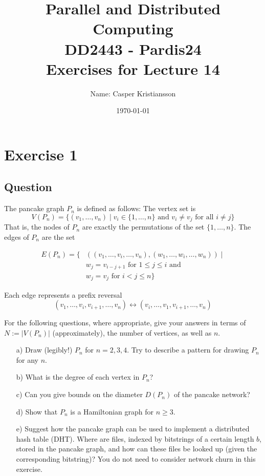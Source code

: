 \documentclass{article}
\title{\textbf{Parallel and Distributed Computing\\DD2443 - Pardis24\\Exercises for Lecture 14}}
\author{Name: Casper Kristiansson}
\date{\today}
\begin{document}
\setlength\parindent{0pt}
\setlength{\parskip}{\bigskipamount}

\maketitle

\section*{Exercise 1}
\subsection*{Question}
The pancake graph $P_n$ is defined as follows: The vertex set is
\[
V (P_n) = \{(v_1, \ldots, v_n) \mid v_i \in \{1, \ldots, n\} \text{ and } v_i \neq v_j \text{ for all } i \neq j\}
\]
That is, the nodes of $P_n$ are exactly the permutations of the set $\{1, \ldots, n\}$. The edges of $P_n$ are the set

\[
\begin{aligned}
E(P_n) = \{ & ((v_1, \ldots, v_i, \ldots, v_n), (w_1, \ldots, w_i, \ldots, w_n)) \mid \\
            & w_j = v_{i-j+1} \text{ for } 1 \leq j \leq i \text{ and } \\
            & w_j = v_j \text{ for } i < j \leq n \}
\end{aligned}
\]


Each edge represents a prefix reversal
\[
(v_1, \ldots, v_i, v_{i+1}, \ldots, v_n) \leftrightarrow (v_i, \ldots, v_1, v_{i+1}, \ldots, v_n)
\]

For the following questions, where appropriate, give your answers in terms of $N := |V (P_n)|$ (approximately), the number of vertices, as well as $n$.
\begin{enumerate}
    \item[a)] Draw (legibly!) $P_n$ for $n = 2, 3, 4$. Try to describe a pattern for drawing $P_n$ for any $n$.
    \item[b)] What is the degree of each vertex in $P_n$?
    \item[c)] Can you give bounds on the diameter $D(P_n)$ of the pancake network?
    \item[d)] Show that $P_n$ is a Hamiltonian graph for $n \geq 3$.
    \item[e)] Suggest how the pancake graph can be used to implement a distributed hash table (DHT). Where are files, indexed by bitstrings of a certain length $b$, stored in the pancake graph, and how can these files be looked up (given the corresponding bitstring)? You do not need to consider network churn in this exercise.
\end{enumerate}
\end{document}
